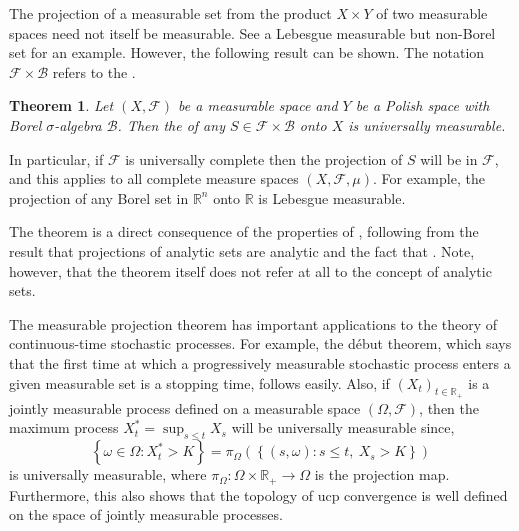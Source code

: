 \documentclass[12pt]{article}
\newtheorem*{theorem*}{Theorem}
\begin{document}

The projection of a measurable set from the product $X\times Y$ of two measurable spaces need not itself be measurable. See a Lebesgue measurable but non-Borel set for an example. However, the following result can be shown. The notation $\mathcal{F}\times\mathcal{B}$ refers to the .

\begin{theorem*}
Let $(X,\mathcal{F})$ be a measurable space and $Y$ be a Polish space with Borel $\sigma$-algebra $\mathcal{B}$.
Then the  of any $S\in\mathcal{F}\times\mathcal{B}$ onto $X$ is universally measurable.
\end{theorem*}

In particular, if $\mathcal{F}$ is universally complete then the projection of $S$ will be in $\mathcal{F}$, and this applies to all complete  measure spaces $(X,\mathcal{F},\mu)$. For example, the projection of any Borel set in $\mathbb{R}^n$ onto $\mathbb{R}$ is Lebesgue measurable.

The theorem is a direct consequence of the properties of , following from the result that projections of analytic sets are analytic and the fact that .
Note, however, that the theorem itself does not refer at all to the concept of analytic sets.

The measurable projection theorem has important applications to the theory of continuous-time stochastic processes. For example, the d\'ebut theorem, which says that the first time at which a progressively measurable stochastic process enters a given measurable set is a stopping time, follows easily. 
Also, if $(X_t)_{t\in\mathbb{R}_+}$ is a jointly measurable process defined on a measurable space $(\Omega,\mathcal{F})$, then the maximum process $X^*_t=\sup_{s\le t}X_s$ will be universally measurable since,
\begin{equation*}
\left\{\omega\in\Omega\colon X^*_t> K\right\}
=\pi_\Omega\left(\left\{(s,\omega)\colon s\le t,\ X_s> K\right\}\right)
\end{equation*}
is universally measurable, where $\pi_\Omega\colon\Omega\times\mathbb{R}_+\to\Omega$ is the projection map.
Furthermore, this also shows that the topology of ucp convergence is well defined on the space of jointly measurable processes.

\end{document}
